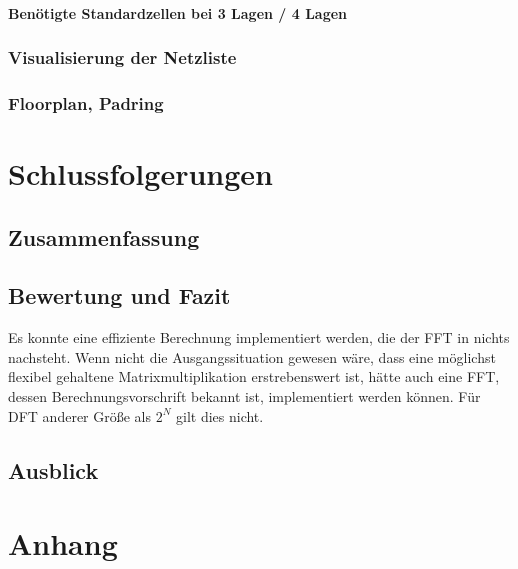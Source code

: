  \subsubsection{Benötigte Standardzellen bei 3 Lagen / 4 Lagen}
 \subsection{Visualisierung der Netzliste}
 \subsection{Floorplan, Padring}
 
 \chapter{Schlussfolgerungen}
 \section{Zusammenfassung}
 \section{Bewertung und Fazit}
 Es konnte eine effiziente Berechnung implementiert werden, die der FFT in nichts nachsteht. Wenn nicht die Ausgangssituation gewesen wäre, dass eine möglichst flexibel gehaltene
 Matrixmultiplikation erstrebenswert ist, hätte auch eine FFT, dessen Berechnungsvorschrift bekannt ist, implementiert werden können. Für DFT anderer Größe als $2^N$ gilt dies nicht.
 
 
 \section{Ausblick}
 
 
 \printglossary[title={Abkürzungsverzeichnis}] 
 
 \listoffigures

 \listoftables

 
 \printbibliography
 
 \chapter{Anhang}
 


